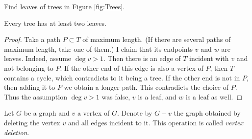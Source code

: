 \begin{page}
\setcounter{section}{2}
\setcounter{subsection}{2}
\setcounter{dfn}{3}
\label{portion:218}


Find leaves of trees in Figure \ref{fig:Trees}.


\end{page}

\begin{page}
\setcounter{section}{2}
\setcounter{subsection}{2}
\setcounter{dfn}{4}
\label{portion:220}

\begin{lem}
\label{lem:LeafTree}
Every tree has at least two leaves.
\end{lem}

\end{page}

\begin{page}
\setcounter{section}{2}
\setcounter{subsection}{2}
\setcounter{dfn}{4}
\label{portion:221}

\begin{proof}
Take a path $P \subset T$ of maximum length.
(If there are several paths of maximum length, take one of them.)
I claim that its endpoints $v$ and $w$ are leaves.
Indeed, assume $\deg v > 1$.
Then there is an edge of $T$ incident with $v$ and not belonging to $P$.
If the other end of this edge is also a vertex of $P$, then $T$ contains a cycle, which contradicts to it being a tree.
If the other end is not in $P$, then adding it to $P$ we obtain a longer path.
This contradicts the choice of $P$.
Thus the assumption $\deg v > 1$ was false, $v$ is a leaf, and $w$ is a leaf as well.
\end{proof}


\end{page}

\begin{page}
\setcounter{section}{2}
\setcounter{subsection}{2}
\setcounter{dfn}{5}
\label{portion:223}

\begin{dfn}
Let $G$ be a graph and $v$ a vertex of $G$.
Denote by $G - v$ the graph obtained by deleting the vertex $v$ and all edges incident to it.
This operation is called \emph{vertex deletion}.
\end{dfn}

\end{page}

